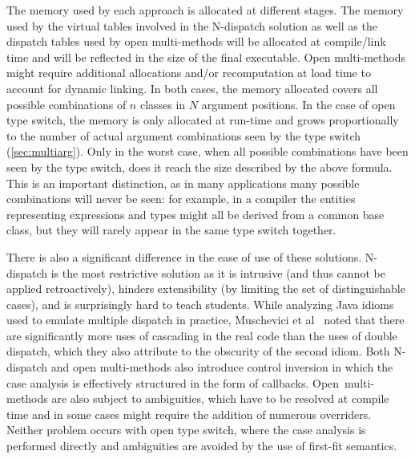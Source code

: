 The memory used by each approach is allocated at different stages. The memory 
used by the virtual tables involved in the N-dispatch solution as well as the
dispatch tables used by open multi-methods will be allocated at compile/link 
time and will be reflected in the size of the final executable. Open 
multi-methods might require additional allocations and/or recomputation at load 
time to account for dynamic linking. In both cases, the memory allocated covers 
all possible combinations of $n$ classes in $N$ argument positions. In the case of 
open type switch, the memory is only allocated at run-time and grows proportionally 
to the number of actual argument combinations seen by the type switch 
(\textsection\ref{sec:multiarg}). Only in the worst case, when all possible 
combinations have been seen by the type switch, does it reach the size described 
by the above formula. This is an important distinction, as in many applications 
many possible combinations will never be seen: for example, in a compiler the 
entities representing expressions and types might all be derived from a common 
base class, but they will rarely appear in the same type switch together.

There is also a significant difference in the ease of use of these solutions. 
N-dispatch is the most restrictive solution as it is intrusive (and thus cannot 
be applied retroactively), hinders extensibility (by limiting the set of 
distinguishable cases), and is surprisingly hard to teach students. While 
analyzing Java idioms used to emulate multiple dispatch in practice, Muschevici 
et al~\cite[Figure 13]{MPTN08} noted that there are significantly more uses of 
cascading  in the real code than the uses of double dispatch, 
which they also attribute to the obscurity of the second idiom. Both N-dispatch 
and open multi-methods also introduce control inversion in which the case 
analysis is effectively structured in the form of callbacks. Open~multi-methods 
are also subject to ambiguities, which have to be resolved at compile time and 
in some cases might require the addition of numerous overriders. Neither problem occurs 
with open type switch, where the case analysis is performed directly and
ambiguities are avoided by the use of first-fit semantics.



